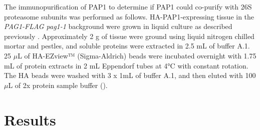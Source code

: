 	The immunopurification of PAP1 to determine if PAP1 could co-purify with 26S proteasome subunits was performed as follows. HA-PAP1-expressing tissue in the \textit{PAG1-FLAG pag1-1} background were grown in liquid culture as described previously \citep{book10}. Approximately 2 g of tissue were ground using liquid nitrogen chilled mortar and pestles, and soluble proteins were extracted in 2.5 mL of buffer A.1. 25 $\mu$L of HA-EZview™ (Sigma-Aldrich) beads were incubated overnight with 1.75 mL of protein extracts in 2 mL Eppendorf tubes at 4°C with constant rotation. The HA beads were washed with 3 x 1mL of buffer A.1, and then eluted with 100$\mu$L of 2x protein sample buffer (\citep{laemmli70}).  

\section{Results}
